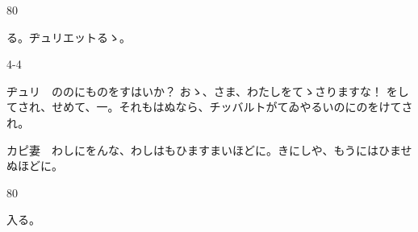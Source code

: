 \documentclass[tate,paper=b6j,jafontsize=9pt]{jlreq}
\begin{document}
\begin{azconvIndented}{8\zw}{0\zw}

る。ヂュリエットるゝ。

\end{azconvIndented}
\begin{azconvIndented}{4\zw}{-4\zw}

ヂュリ　ののにものをすはいか？ おゝ、さま、わたしをてゝさりますな！ をしてされ、せめて、一。それもはぬなら、チッバルトがてゐやるいのにのをけてされ。

カピ妻　わしにをんな、わしはもひますまいほどに。きにしや、もうにはひませぬほどに。

\end{azconvIndented}
\begin{azconvIndented}{8\zw}{0\zw}

入る。

\end{azconvIndented}
\end{document}
